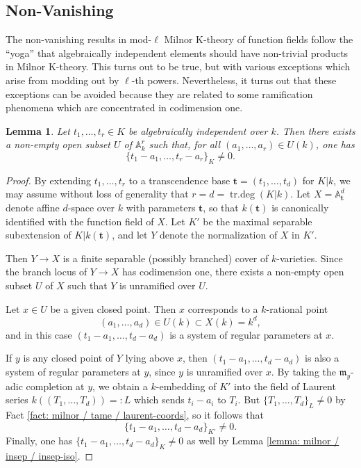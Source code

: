 \documentclass[11pt]{amsart}
\newtheorem{lemma}[proposition]{Lemma}
\theoremstyle{definition}
\theoremstyle{remark}
\numberwithin{equation}{section}
\DeclareMathOperator{\trdeg}{tr.deg}
\newcommand{\Abb}{\mathbb{A}}
\newcommand{\tbf}{\mathbf{t}}
\newcommand{\mf}{\mathfrak{m}}
\begin{document}
\subsection{Non-Vanishing}
\label{subsection: milnorff / nonvanishing}

The non-vanishing results in mod-$\ell$ Milnor K-theory of function fields follow the ``yoga'' that algebraically independent elements should have non-trivial products in Milnor K-theory.
This turns out to be true, but with various exceptions which arise from modding out by $\ell$-th powers.
Nevertheless, it turns out that these exceptions can be avoided because they are related to some ramification phenomena which are concentrated in codimension one.

\begin{lemma}
\label{lemma: milnorff / nonvanishing / alg-indep-coords}
  Let $t_1,\ldots,t_r \in K$ be algebraically independent over $k$.
  Then there exists a non-empty open subset $U$ of $\Abb^r_k$ such that, for all $(a_1,\ldots,a_r) \in U(k)$, one has 
  \[ \{t_1-a_1,\ldots,t_r-a_r\}_K \neq 0. \]
\end{lemma}
\begin{proof}
  By extending $t_1,\ldots,t_r$ to a transcendence base $\tbf = (t_1,\ldots,t_d)$ for $K|k$, we may assume without loss of generality that $r = d = \trdeg(K|k)$.
  Let $X = \Abb^d_\tbf$ denote affine $d$-space over $k$ with parameters $\tbf$, so that $k(\tbf)$ is canonically identified with the function field of $X$.
  Let $K'$ be the maximal separable subextension of $K|k(\tbf)$, and let $Y$ denote the normalization of $X$ in $K'$.

  Then $Y \rightarrow X$ is a finite separable (possibly branched) cover of $k$-varieties.
  Since the branch locus of $Y \rightarrow X$ has codimension one, there exists a non-empty open subset $U$ of $X$ such that $Y$ is unramified over $U$.

  Let $x \in U$ be a given closed point.
  Then $x$ corresponds to a $k$-rational point
  \[ (a_1,\ldots,a_d) \in U(k) \subset X(k) = k^d, \]
  and in this case $(t_1-a_1,\ldots,t_d-a_d)$ is a system of regular parameters at $x$.

  If $y$ is any closed point of $Y$ lying above $x$, then $(t_1-a_1,\ldots,t_d-a_d)$ is also a system of regular parameters at $y$, since $y$ is unramified over $x$.
  By taking the $\mf_y$-adic completion at $y$, we obtain a $k$-embedding of $K'$ into the field of Laurent series $k((T_1,\ldots,T_d)) =: L$ which sends $t_i-a_i$ to $T_i$.
  But $\{T_1,\ldots,T_d\}_L \neq 0$ by Fact \ref{fact: milnor / tame / laurent-coords}, so it follows that
  \[ \{t_1-a_1,\ldots,t_d-a_d\}_{K'} \neq 0. \]
  Finally, one has $\{t_1-a_1,\ldots,t_d-a_d\}_K \neq 0$ as well by Lemma \ref{lemma: milnor / insep / insep-iso}.
\end{proof}
\end{document}
